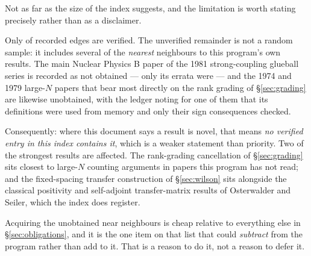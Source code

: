 Not as far as the size of the index suggests, and the limitation is
worth stating precisely rather than as a disclaimer.

Only \LitVerified{} of \LitEdges{} recorded edges are verified. The
unverified remainder is not a random sample: it includes several of the
\emph{nearest} neighbours to this program's own results. The main
Nuclear Physics B paper of the 1981 strong-coupling glueball series is
recorded as not obtained --- only its errata were --- and the 1974 and
1979 large-$N$ papers that bear most directly on the rank grading of
\S\ref{sec:grading} are likewise unobtained, with the ledger noting for
one of them that its definitions were used from memory and only their
sign consequences checked.

Consequently: where this document says a result is novel, that means
\emph{no verified entry in this index contains it}, which is a weaker
statement than priority. Two of the strongest results are affected. The
rank-grading cancellation of \S\ref{sec:grading} sits closest to
large-$N$ counting arguments in papers this program has not read; and
the fixed-spacing transfer construction of \S\ref{sec:wilson} sits
alongside the classical positivity and self-adjoint transfer-matrix
results of Osterwalder and Seiler, which the index does register.

Acquiring the unobtained near neighbours is cheap relative to
everything else in \S\ref{sec:obligations}, and it is the one item on
that list that could \emph{subtract} from the program rather than add
to it. That is a reason to do it, not a reason to defer it.



